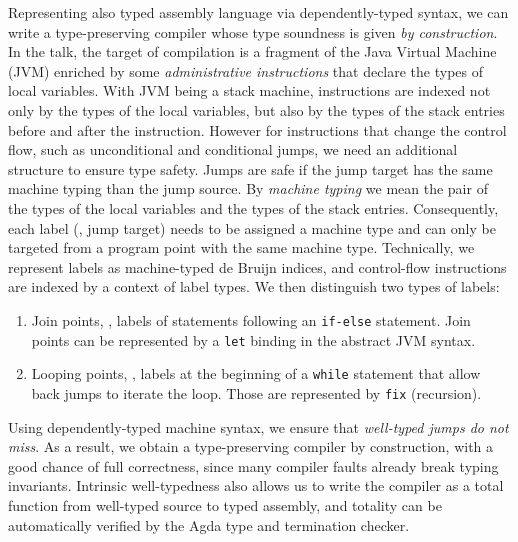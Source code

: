 \documentclass[a4paper]{easychair}
\begin{document}
Representing also typed assembly language
\citep{morrisettWalkerCraryGlew:toplas99} via dependently-typed
syntax, we can write a type-preserving compiler whose type soundness
is given \emph{by construction}.  In the talk, the target of
compilation is a fragment of the Java Virtual Machine (JVM) enriched
by some \emph{administrative instructions} that declare the types of
local variables.  With JVM being a stack machine, instructions are
indexed not only by the types of the local variables, but also by the
types of the stack entries before and after the instruction.  However
for instructions that change the control flow, such as unconditional
and conditional jumps, we need an additional structure to ensure type
safety.  Jumps are safe if the jump target has the same machine typing
than the jump source.  By \emph{machine typing} we mean the pair of
the types of the local variables and the types of the stack entries.
Consequently, each label (\ie, jump target) needs to be assigned a
machine type and can only be targeted from a program point with the
same machine type.  Technically, we represent labels as machine-typed
de Bruijn indices, and control-flow instructions are indexed by a
context of label types.  We then distinguish two types of labels:
\begin{enumerate}
\item Join points, \eg, labels of statements following an \texttt{if-else} statement.
  Join points can be represented by a \texttt{let} binding in the abstract JVM
  syntax.
\item Looping points, \eg, labels at the beginning of a \texttt{while}
  statement that allow back jumps to iterate the loop.  Those are
  represented by \texttt{fix} (recursion).
\end{enumerate}
Using dependently-typed machine syntax, we ensure that
\emph{well-typed jumps do not miss}.  As a result, we obtain a
type-preserving compiler by construction, with a good chance of full
correctness, since many compiler faults already break typing invariants.
Intrinsic well-typedness also allows us to write the compiler as a
total function from well-typed source to typed assembly, and totality
can be automatically verified by the Agda type and termination checker.





%


\end{document}
